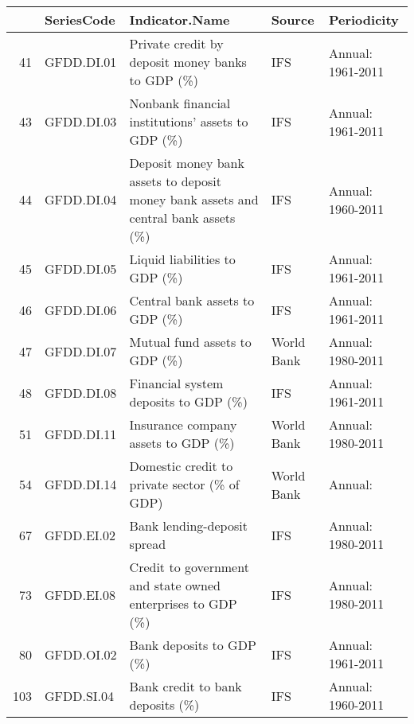 \begin{tabular}{rllll}
  \hline
 & SeriesCode & Indicator.Name & Source & Periodicity \\ 
  \hline
41 & GFDD.DI.01 & Private credit by deposit money banks to GDP (\%) & IFS & Annual: 1961-2011 \\ 
  43 & GFDD.DI.03 & Nonbank financial institutions' assets to GDP (\%) & IFS & Annual: 1961-2011 \\ 
  44 & GFDD.DI.04 & Deposit money bank assets to deposit money bank assets and central bank assets (\%) & IFS & Annual: 1960-2011 \\ 
  45 & GFDD.DI.05 & Liquid liabilities to GDP (\%) & IFS & Annual: 1961-2011 \\ 
  46 & GFDD.DI.06 & Central bank assets to GDP (\%) & IFS & Annual: 1961-2011 \\ 
  47 & GFDD.DI.07 & Mutual fund assets to GDP (\%) & World Bank & Annual: 1980-2011 \\ 
  48 & GFDD.DI.08 & Financial system deposits to GDP (\%) & IFS & Annual: 1961-2011 \\ 
  51 & GFDD.DI.11 & Insurance company assets to GDP (\%) & World Bank & Annual: 1980-2011 \\ 
  54 & GFDD.DI.14 & Domestic credit to private sector (\% of GDP) & World Bank & Annual: \\ 
  67 & GFDD.EI.02 & Bank lending-deposit spread & IFS & Annual: 1980-2011 \\ 
  73 & GFDD.EI.08 & Credit to government and state owned enterprises to GDP (\%) & IFS & Annual: 1980-2011 \\ 
  80 & GFDD.OI.02 & Bank deposits to GDP (\%) & IFS & Annual: 1961-2011 \\ 
  103 & GFDD.SI.04 & Bank credit to bank deposits (\%) & IFS & Annual: 1960-2011 \\ 
   \hline
\end{tabular}
